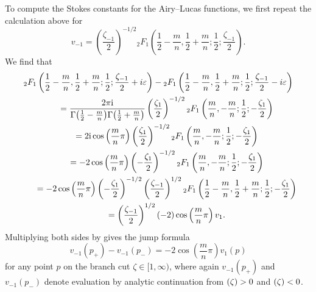 \documentclass[pdftex]{sigma}
\let\Im\relax
\DeclareMathOperator{\Im}{Im}
\numberwithin{equation}{section}
\begin{document}
To compute the Stokes constants for the Airy--Lucas functions, we first repeat the calculation above for
\[ v_{-1} = \left(\frac{\zeta_{-1}}{2}\right)^{-1/2} {}_2F_1\left(\frac{1}{2}-\frac{m}{n},\frac{1}{2}+\frac{m}{n};\frac{1}{2};\frac{\zeta_{-1}}{2}\right). \]
We find that
\begin{gather*}
{}_2F_1\left(\frac{1}{2}-\frac{m}{n},\frac{1}{2}+\frac{m}{n};\frac{1}{2};\frac{\zeta_{-1}}{2}+i\varepsilon\right)-{}_2F_1\left(\frac{1}{2}-\frac{m}{n},\frac{1}{2}+\frac{m}{n};\frac{1}{2};\frac{\zeta_{-1}}{2}-i\varepsilon\right) \\
\qquad=\frac{2 \pi {\rm i}}{\Gamma\bigl(\frac{1}{2}-\frac{m}{n}\bigr)\Gamma\bigl(\frac{1}{2}+\frac{m}{n}\bigr)} \left(\frac{\zeta_1}{2}\right)^{-1/2} {}_2F_1\left(\frac{m}{n},-\frac{m}{n};\frac{1}{2};-\frac{\zeta_1}{2}\right) \\
\qquad=2{\rm i}\cos\left(\frac{m}{n}\pi\right) \left(\frac{\zeta_1}{2}\right)^{-1/2} {}_2F_1\left(\frac{m}{n},-\frac{m}{n};\frac{1}{2};-\frac{\zeta_1}{2}\right) \\
\qquad=-2\cos\left(\frac{m}{n}\pi\right) \left(-\frac{\zeta_1}{2}\right)^{-1/2} {}_2F_1\left(\frac{m}{n},-\frac{m}{n};\frac{1}{2};-\frac{\zeta_1}{2}\right) \\
\qquad=-2\cos\left(\frac{m}{n}\pi\right) \left(-\frac{\zeta_{1}}{2}\right)^{-1/2} \left(\frac{\zeta_{-1}}{2}\right)^{1/2} {}_2F_1\left(\frac{1}{2}-\frac{m}{n},\frac{1}{2}+\frac{m}{n};\frac{1}{2};-\frac{\zeta_1}{2}\right) \\
\qquad=\left(\frac{\zeta_{-1}}{2}\right)^{1/2} (-2)\cos\left(\frac{m}{n}\pi\right) v_1.
\end{gather*}
Multiplying both sides by  gives the jump formula
\begin{equation}\label{eqn:resurg-rel-2}
v_{-1}(p_+) - v_{-1}(p_-) = -2\cos\left(\frac{m}{n}\pi\right) v_1(p)
\end{equation}
for any point $p$ on the branch cut $\zeta \in [1, \infty)$, where again $v_{-1}(p_+)$ and $v_{-1}(p_-)$ denote evaluation by analytic continuation from $\Im(\zeta) > 0$ and $\Im(\zeta) < 0$.
\end{document}
